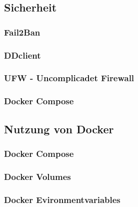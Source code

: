 
\subsection{Sicherheit}

\subsubsection{Fail2Ban}

\subsubsection{DDclient}

\subsubsection{UFW - Uncomplicadet Firewall}

\subsubsection{Docker Compose}


\subsection{Nutzung von Docker}

\subsubsection{Docker Compose}

\subsubsection{Docker Volumes}

\subsubsection{Docker Evironmentvariables}
